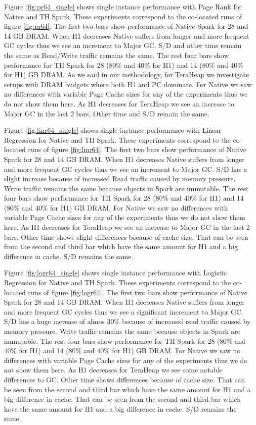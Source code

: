Figure \ref{fig:pr64_single} shows single instance performance with Page Rank for Native and TH Spark. These experiments correspond to the co-located runs of figure \ref{fig:pr64}. The first two bars show performance of Native Spark for 28 and 14 GB DRAM. When H1 decreases Native suffers from longer and more frequent GC cycles thus we see an increment to Major GC. S/D and other time remain the same as Read/Write traffic remains the same. The rest four bars show performance for TH Spark for 28 (80\% and 40\% for H1) and 14 (80\% and 40\% for H1) GB DRAM. As we said in our methodology, for TeraHeap we investigate setups with DRAM budgets where both H1 and PC dominate. For Native we saw no differences with variable Page Cache sizes for any of the experiments thus we do not show them here. As H1 decreases for TeraHeap we see an increase to Major GC in the last 2 bars. Other time and S/D remain the same.

Figure \ref{fig:linr64_single} shows single instance performance with Linear Regression for Native and TH Spark. These experiments correspond to the co-located runs of figure \ref{fig:linr64}. The first two bars show performance of Native Spark for 28 and 14 GB DRAM. When H1 decreases Native suffers from longer and more frequent GC cycles thus we see an increment to Major GC. S/D has a slight increase because of increased Read traffic caused by memory pressure. Write traffic remains the same because objects in Spark are immutable. The rest four bars show performance for TH Spark for 28 (80\% and 40\% for H1) and 14 (80\% and 40\% for H1) GB DRAM. For Native we saw no differences with variable Page Cache sizes for any of the experiments thus we do not show them here. As H1 decreases for TeraHeap we see an increase to Major GC in the last 2 bars. Other time shows slight differences because of cache size. That can be seen from the second and third bar which have the same amount for H1 and a big difference in cache. S/D remains the same.

Figure \ref{fig:logr64_single} shows single instance performance with Logistic Regression for Native and TH Spark. These experiments correspond to the co-located runs of figure \ref{fig:logr64}. The first two bars show performance of Native Spark for 28 and 14 GB DRAM. When H1 decreases Native suffers from longer and more frequent GC cycles thus we see a significant increment to Major GC. S/D has a huge increase of almos 30\% because of increased read traffic caused by memory pressure. Write traffic remains the same because objects in Spark are immutable. The rest four bars show performance for TH Spark for 28 (80\% and 40\% for H1) and 14 (80\% and 40\% for H1) GB DRAM. For Native we saw no differences with variable Page Cache sizes for any of the experiments thus we do not show them here. As H1 decreases for TeraHeap we see some notable differences to GC. Other time shows differences because of cache size. That can be seen from the second and third bar which have the same amount for H1 and a big difference in cache. That can be seen from the second and third bar which have the same amount for H1 and a big difference in cache. S/D remains the same.

